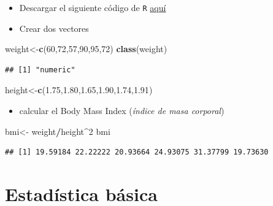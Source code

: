 \documentclass[]{book}
\newenvironment{Shaded}{\begin{snugshade}}{\end{snugshade}}
\newcommand{\KeywordTok}[1]{\textcolor[rgb]{0.13,0.29,0.53}{\textbf{#1}}}
\newcommand{\DecValTok}[1]{\textcolor[rgb]{0.00,0.00,0.81}{#1}}
\newcommand{\FloatTok}[1]{\textcolor[rgb]{0.00,0.00,0.81}{#1}}
\newcommand{\StringTok}[1]{\textcolor[rgb]{0.31,0.60,0.02}{#1}}
\newcommand{\OperatorTok}[1]{\textcolor[rgb]{0.81,0.36,0.00}{\textbf{#1}}}
\newcommand{\NormalTok}[1]{#1}
\providecommand{\tightlist}{%
  \setlength{\itemsep}{0pt}\setlength{\parskip}{0pt}}
\begin{document}
\begin{itemize}
\item
  Descargar el siguiente código de \texttt{R}
  \href{http://idaejin.github.io/bcam-courses/rbasics/rbasics.R}{aquí}
\item
  Crear dos vectores
\end{itemize}

\begin{Shaded}
\begin{Highlighting}[]
\NormalTok{weight<-}\KeywordTok{c}\NormalTok{(}\DecValTok{60}\NormalTok{,}\DecValTok{72}\NormalTok{,}\DecValTok{57}\NormalTok{,}\DecValTok{90}\NormalTok{,}\DecValTok{95}\NormalTok{,}\DecValTok{72}\NormalTok{)  }
\KeywordTok{class}\NormalTok{(weight)}
\end{Highlighting}
\end{Shaded}

\begin{verbatim}
## [1] "numeric"
\end{verbatim}

\begin{Shaded}
\begin{Highlighting}[]
\NormalTok{height<-}\KeywordTok{c}\NormalTok{(}\FloatTok{1.75}\NormalTok{,}\FloatTok{1.80}\NormalTok{,}\FloatTok{1.65}\NormalTok{,}\FloatTok{1.90}\NormalTok{,}\FloatTok{1.74}\NormalTok{,}\FloatTok{1.91}\NormalTok{)}
\end{Highlighting}
\end{Shaded}

\begin{itemize}
\tightlist
\item
  calcular el Body Mass Index (\emph{índice de masa corporal})
\end{itemize}

\begin{Shaded}
\begin{Highlighting}[]
\NormalTok{bmi<-}\StringTok{ }\NormalTok{weight}\OperatorTok{/}\NormalTok{height}\OperatorTok{^}\DecValTok{2}
\NormalTok{bmi}
\end{Highlighting}
\end{Shaded}

\begin{verbatim}
## [1] 19.59184 22.22222 20.93664 24.93075 31.37799 19.73630
\end{verbatim}

\section{Estadística básica}\label{estadistica-basica}
\end{document}

